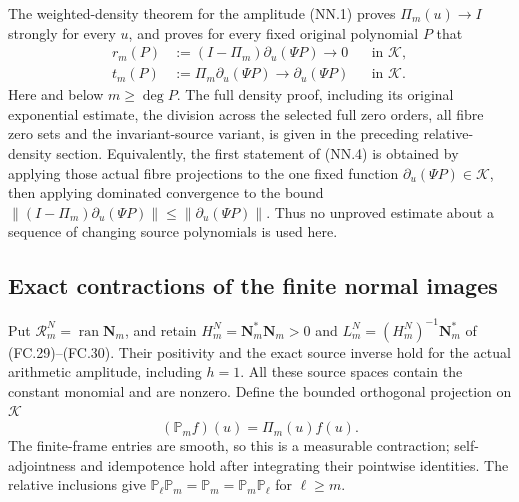 The weighted-density theorem for the amplitude (NN.1) proves
\(\Pi_m(u)\to I\) strongly for every \(u\), and proves for every
fixed original polynomial \(P\) that
\[
 \begin{aligned}
 r_m(P)&:=(I-\Pi_m)\partial_u(\Psi P)\longrightarrow0
                                      &&\text{in }\mathscr K,\\
 t_m(P)&:=\Pi_m\partial_u(\Psi P)\longrightarrow
                      \partial_u(\Psi P)&&\text{in }\mathscr K.
 \end{aligned}
 \tag{NN.4}
\]
Here and below \(m\ge\deg P\). The full density proof, including its
original exponential estimate, the division across the selected full
zero orders, all fibre zero sets and the invariant-source variant,
is given in the preceding relative-density section. Equivalently,
the first statement of (NN.4) is obtained by applying those actual
fibre projections to the one fixed function
\(\partial_u(\Psi P)\in\mathscr K\), then applying dominated
convergence to the bound
\(\|(I-\Pi_m)\partial_u(\Psi P)\|\le
\|\partial_u(\Psi P)\|\). Thus no unproved estimate about a sequence
of changing source polynomials is used here.

\subsection{Exact contractions of the finite normal images}

Put \(\mathscr R_m^N=\operatorname{ran}\boldsymbol N_m\), and retain
\(H_m^N=\boldsymbol N_m^*\boldsymbol N_m>0\) and
\(L_m^N=(H_m^N)^{-1}\boldsymbol N_m^*\) of (FC.29)--(FC.30).
Their positivity and the exact source inverse hold for the actual
arithmetic amplitude, including \(h=1\). All these source spaces
contain the constant monomial and are nonzero. Define the bounded
orthogonal projection on \(\mathscr K\)
\[
 (\mathbb P_m f)(u)=\Pi_m(u)f(u).
 \tag{NN.5}
\]
The finite-frame entries are smooth, so this is a measurable contraction;
self-adjointness and idempotence hold after integrating their pointwise
identities. The relative inclusions give
\(\mathbb P_\ell\mathbb P_m=\mathbb P_m
=\mathbb P_m\mathbb P_\ell\) for \(\ell\ge m\).

